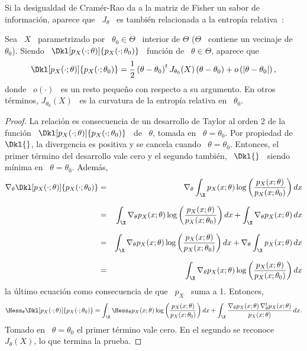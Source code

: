 Si  la  desigualdad de  Cram\'er-Rao  da  a la  matriz  de  Fisher  un sabor  de
informaci\'on,  aparece  que  \  $J_\theta$  \ es  tambi\'en  relacionada  a  la
entrop\'ia relativa~\cite{CovTho06, Fri04}:
%
\begin{teorema}
  Sea \ $X$ \ parametrizado por \ $\theta_0 \in \mathring{\Theta}$ \ interior de
  $\Theta$  ($\Theta$  \  contiene  un  vecinaje de  \  $\theta_0$).   Siendo  \
  $\Dkl[p_X(\cdot;\theta)]{p_X(\cdot;\theta_0)}$  \ funci\'on  de \  $\theta \in
  \Theta$, aparece que
  \[
  \Dkl[p_X(\cdot;\theta)]{p_X(\cdot;\theta_0)}   =  \frac12   \left(   \theta  -
      \theta_0  \right)^t J_{\theta_0}(X)  \left(  \theta -  \theta_0 \right)  +
    o\left( | \theta - \theta_0 |\right),
  \]
  donde \  $o(\cdot)$ \ es un resto  peque\~no con respecto a  su argumento.  En
  otros  t\'erminos,  $J_{\theta_0}(X)$  \  es  la curvatura  de  la  entrop\'ia
  relativa en \ $\theta_0$.
\end{teorema}
%
\begin{proof}
  La relaci\'on  es consecuencia  de un desarrollo  de Taylor  al orden 2  de la
  funci\'on \  $\Dkl[p_X(\cdot;\theta)]{p_X(\cdot;\theta_0)}$ \ de  \ $\theta$,
  tomada en \  $\theta = \theta_0$. Por propiedad de  \ $\Dkl{}$, la divergencia
  es positiva  y se cancela cuando  \ $\theta = \theta_0$.   Entonces, el primer
  t\'ermino del desarrollo vale cero y el segundo tambi\'en, \ $\Dkl{}$ \ siendo
  m\'inima en \ $\theta = \theta_0$. Adem\'as,
  \begin{eqnarray*}
  \nabla_\theta \Dkl[p_X(\cdot;\theta)]{p_X(\cdot;\theta_0)} & =
  & \nabla_\theta \int_\X p_X(x;\theta) \log \left(
  \frac{p_X(x;\theta)}{p_X(x;\theta_0)} \right) dx\\[2.5mm]
  & = & \int_\X \nabla_\theta p_X(x;\theta) \log \left(
  \frac{p_X(x;\theta)}{p_X(x;\theta_0)} \right) dx + \int_\X \nabla_\theta
  p_X(x;\theta) \, dx\\[2.5mm]
  & = & \int_\X \nabla_\theta p_X(x;\theta) \log \left(
  \frac{p_X(x;\theta)}{p_X(x;\theta_0)} \right) dx + \nabla_\theta \int_\X
  p_X(x;\theta) \, dx\\[2.5mm]
  & = & \int_\X \nabla_\theta p_X(x;\theta) \log \left(
  \frac{p_X(x;\theta)}{p_X(x;\theta_0)} \right) dx
  \end{eqnarray*}
  la \'ultimo ecuaci\'on como consecuencia de que \ $p_X$ \ suma a 1.  Entonces,
  \[
  \Hess_\theta     \Dkl[p_X(\cdot;\theta)]{p_X(\cdot;\theta_0)}     =    \int_\X
  \Hess_\theta  p_X(x;\theta) \log  \left( \frac{p_X(x;\theta)}{p_X(x;\theta_0)}
  \right)  dx  + \int_\X  \frac{\nabla_\theta  p_X(x;\theta) \,  \nabla^t_\theta
    p_X(x;\theta)}{p_X(x;\theta)} \, dx.
  \]
  Tomado en \ $\theta = \theta_0$  el primer t\'ermino vale cero.  En el segundo
  se reconoce \ $J_\theta(X)$, lo que termina la prueba.
\end{proof}
